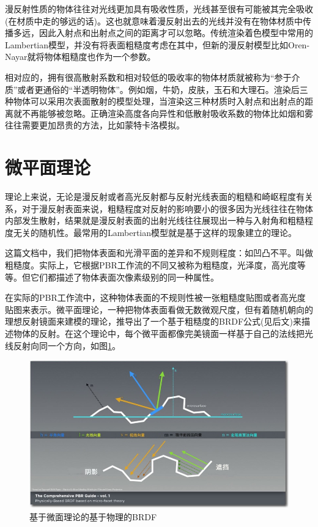 漫反射性质的物体往往对光线更加具有吸收性质，光线甚至很有可能被其完全吸收(在材质中走的够远的话)。这也就意味着漫反射出去的光线并没有在物体材质中传播多远，因此入射点和出射点之间的距离才可以忽略。传统渲染着色模型中常用的Lambertian模型，并没有将表面粗糙度考虑在其中，但新的漫反射模型比如Oren-Nayar就将物体粗糙度也作为一个参数。

相对应的，拥有很高散射系数和相对较低的吸收率的物体材质就被称为“参于介质”或者更通俗的“半透明物体”。例如烟，牛奶，皮肤，玉石和大理石。渲染后三种物体可以采用次表面散射的模型处理，当渲染这三种材质时入射点和出射点的距离就不再能够被忽略。正确渲染高度各向异性和低散射吸收系数的物体比如烟和雾往往需要更加昂贵的方法，比如蒙特卡洛模拟。

\section{微平面理论}

理论上来说，无论是漫反射或者高光反射都与反射光线表面的粗糙和崎岖程度有关系，对于漫反射表面来说，粗糙程度对反射的影响要小的很多因为光线往往在物体内部发生散射，结果就是漫反射表面的出射光线往往展现出一种与入射角和粗糙程度无关的随机性。最常用的Lambertian模型就是基于这样的现象建立的理论。

这篇文档中，我们把物体表面和光滑平面的差异和不规则程度：如凹凸不平。叫做粗糙度。实际上，它根据PBR工作流的不同又被称为粗糙度，光泽度，高光度等等。但它们都描述了物体表面次像素级别的同一种属性。

在实际的PBR工作流中，这种物体表面的不规则性被一张粗糙度贴图或者高光度贴图来表示。微平面理论，一种把物体表面看做无数微观尺度，但有着随机朝向的理想反射镜面来建模的理论，推导出了一个基于粗糙度的BRDF公式(见后文)来描述物体的反射。在这个理论中，每个微平面都像完美镜面一样基于自己的法线把光线反射向同一个方向，如图\ref{fig:chap1_5}。

\begin{figure}[ht]
    \centering
	\includegraphics[width=\textwidth]{images/chap1_5.jpg}
	\caption{基于微面理论的基于物理的BRDF}
    \label{fig:chap1_5}
\end{figure}

